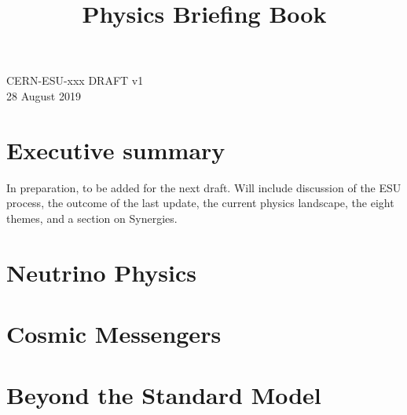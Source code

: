 \documentclass[12pt,twoside,a4paper]{cernrep}
\def\bibfiles{\main/bib/chapter,\main/ewksection/bib/section,\main/Strong-Interaction/bib/section,\main/Flavour/bib/section,\main/Neutrino/bib/section,\main/Cosmic/bib/section,\main/BSM/EWSB/bib/section,\main/BSM/SUSY/bib/section,\main/BSM/ExtendedScalars/bib/section,\main/BSM/DM/bib/section,\main/BSM/FIPs/bib/section,\main/Darkmatter/bib/maindm,\main/Darkmatter/section1/bib/section,\main/Darkmatter/section2/bib/section,\main/Darkmatter/section3/bib/section,\main/Darkmatter/section4/bib/section,\main/Accelerator/bib/section,\main/Instrum/bib/section,\main/section1/bib/section}
\begin{document}
\newcommand{\main}{.}
\def\biblio{}
\begin{flushright}
CERN-ESU-xxx DRAFT v1\\
28 August 2019
\vspace*{6mm}
\end{flushright}
\title{
  \huge \centerline{Physics Briefing Book}}

\maketitle

\setcounter{tocdepth}{1}
\tableofcontents
\newpage
{}
%
\chapter{Executive summary}
\label{chap:summ}
In preparation, to be added for the next draft.  Will include discussion of the ESU process, the outcome of the last update, the current physics landscape, the eight themes, and a section on Synergies. 




\chapter{Neutrino Physics} 
\label{chap:neut}

\chapter{Cosmic Messengers} 
\label{chap:cosm}

\chapter{Beyond the Standard Model} 
\label{chap:bsm}
\linenumbers











\newpage



\end{document}
